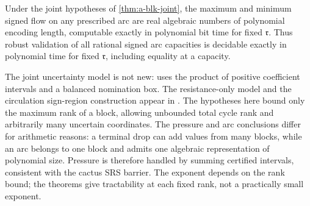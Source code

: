 \begin{theorem}
\label{thm:a-blk-arc}
Under the joint hypotheses of \cref{thm:a-blk-joint}, the maximum and
minimum signed flow on any prescribed arc are real algebraic numbers
of polynomial encoding length, computable exactly in polynomial bit
time for fixed $\mathfrak r$. Thus robust validation of all rational
signed arc capacities is decidable exactly in polynomial time for
fixed $\mathfrak r$, including equality at a capacity.
\end{theorem}

The joint uncertainty model is not new:
\citet[Section 3.3, equations (3.2)--(3.4), p.~56]{amann2019-exact-methods-for-two-stage}
uses the product of positive coefficient intervals and a balanced
nomination box. The resistance-only model and the circulation
sign-region construction appear in
\citet[Sections 4.1.4 and 4.3.2, Proposition 4.7
(arXiv v1 numbering)]{amann2018-deciding-robust-feasibility-and-infeasibility}.
The hypotheses here bound only the maximum rank of a block, allowing
unbounded total cycle rank and arbitrarily many uncertain coordinates.
The pressure and arc conclusions differ for arithmetic reasons: a
terminal drop can add values from many blocks, while an arc belongs to
one block and admits one algebraic representation of polynomial size.
Pressure is therefore handled by summing certified intervals, consistent
with the cactus SRS barrier. The exponent depends on the rank bound;
the theorems give tractability at each fixed rank, not a practically
small exponent.


